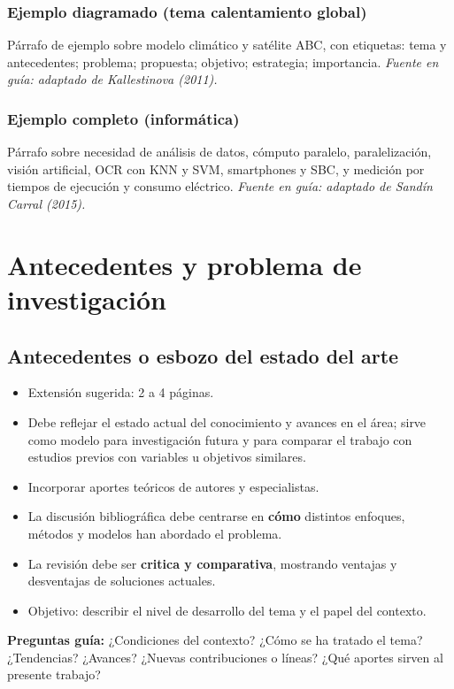 \documentclass[a4paper,11pt]{book}
\begin{document}
\subsection*{Ejemplo diagramado (tema calentamiento global)}
Párrafo de ejemplo sobre modelo climático y satélite ABC, con etiquetas: tema y antecedentes; problema; propuesta; objetivo; estrategia; importancia. \textit{Fuente en guía: adaptado de Kallestinova (2011).}

\subsection*{Ejemplo completo (informática)}
Párrafo sobre necesidad de análisis de datos, cómputo paralelo, paralelización, visión artificial, OCR con KNN y SVM, smartphones y SBC, y medición por tiempos de ejecución y consumo eléctrico. \textit{Fuente en guía: adaptado de Sandín Carral (2015).}

\chapter{Antecedentes y problema de investigación}
\label{cap:antecedentes}

\section{Antecedentes o esbozo del estado del arte}
\begin{itemize}[leftmargin=*]
  \item Extensión sugerida: 2 a 4 páginas.
  \item Debe reflejar el estado actual del conocimiento y avances en el área; sirve como modelo para investigación futura y para comparar el trabajo con estudios previos con variables u objetivos similares.
  \item Incorporar aportes teóricos de autores y especialistas.
  \item La discusión bibliográfica debe centrarse en \textbf{cómo} distintos enfoques, métodos y modelos han abordado el problema.
  \item La revisión debe ser \textbf{critica y comparativa}, mostrando ventajas y desventajas de soluciones actuales.
  \item Objetivo: describir el nivel de desarrollo del tema y el papel del contexto.
\end{itemize}

\textbf{Preguntas guía:} ¿Condiciones del contexto? ¿Cómo se ha tratado el tema? ¿Tendencias? ¿Avances? ¿Nuevas contribuciones o líneas? ¿Qué aportes sirven al presente trabajo?
\end{document}

